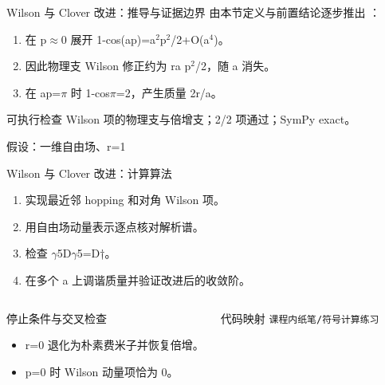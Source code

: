 \begin{frame}[t]{Wilson 与 Clover 改进：推导与证据边界}
\footnotesize
{}\quad 由本节定义与前置结论逐步推出 ：
\begin{enumerate}
\item 在 p\ensuremath{\approx}0 展开 1-cos(ap)=a\ensuremath{^{2}}p\ensuremath{^{2}}/\allowbreak{}2+O(a\ensuremath{^{4}})。
\item 因此物理支 Wilson 修正约为 ra p\ensuremath{^{2}}/\allowbreak{}2，随 a 消失。
\item 在 ap=\ensuremath{\pi} 时 1-cos\ensuremath{\pi}=2，产生质量 2r/\allowbreak{}a。
\end{enumerate}\begin{block}{可执行检查}
\quad Wilson 项的物理支与倍增支；2/2 项通过；SymPy exact。
\par\scriptsize 假设：一维自由场、r=1
\end{block}
\end{frame}

\begin{frame}[t]{Wilson 与 Clover 改进：计算算法}
\footnotesize
{}\begin{enumerate}
\item 实现最近邻 hopping 和对角 Wilson 项。
\item 用自由场动量表示逐点核对解析谱。
\item 检查 \ensuremath{\gamma}5D\ensuremath{\gamma}5=D†。
\item 在多个 a 上调谐质量并验证改进后的收敛阶。
\end{enumerate}\begin{columns}[T,onlytextwidth]
\begin{block}{停止条件与交叉检查}\scriptsize\begin{itemize}
\item[\CheckMark] r=0 退化为朴素费米子并恢复倍增。
\item[\CheckMark] p=0 时 Wilson 动量项恰为 0。
\end{itemize}\end{block}
\begin{block}{代码映射}
\scriptsize \texttt{课程内纸笔/\allowbreak{}符号计算练习}
\end{block}\end{columns}\end{frame}

